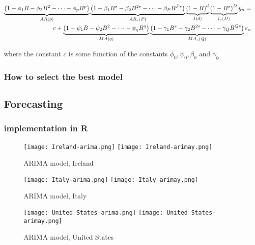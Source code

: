 \begin{align}
\underbrace{\left(1-\phi_1 B-\phi_2B^2-\dots-\phi_p B^p\right)}_{AR(p)}
\underbrace{\left(1-\beta_1 B^s-\beta_2B^{2s}-\dots-\beta_P B^{Ps}\right)}_{AR_s(P)} 
\underbrace{\left(1-B\right)^d}_{I(d)}\underbrace{\left(1-B^s\right)^D}_{I_s(D)}   y_n = \nonumber \\
 c+
\underbrace{\left(1-\psi_1 B-\psi_2B^2-\dots-\psi_q B^q\right)}_{MA(q)}
\underbrace{\left(1-\gamma_1 B^s-\gamma_2B^{2s}-\dots-\gamma_Q B^{Qs}\right)}_{MA_s(Q)} \varepsilon_n
\end{align}

where the constant $c$ is some function of the constants $\phi_0,\psi_0,\beta_0$ and $\gamma_0$ 

\subsubsection{How to select the best model}

\subsection{Forecasting}

\subsubsection{implementation in R}


\begin{figure}[H]
  \texttt{[image: Ireland-arima.png]} \label{fig:ireland-arima}
\endminipage\hfill
{}
  \texttt{[image: Ireland-arimay.png]} \label{fig:ireland-arimay}
\endminipage
\caption{ARIMA model, Ireland}
\end{figure}

\begin{figure}[H]
  \texttt{[image: Italy-arima.png]} \label{fig:italy-arima}
\endminipage\hfill
{}
  \texttt{[image: Italy-arimay.png]} \label{fig:italy-arimay}
\endminipage
\caption{ARIMA model, Italy}
\end{figure}

\begin{figure}[H]
  \texttt{[image: United States-arima.png]} \label{fig:usa-arima}
\endminipage\hfill
{}
  \texttt{[image: United States-arimay.png]} \label{fig:usa-arimay}
\endminipage
\caption{ARIMA model, United States}
\end{figure}

